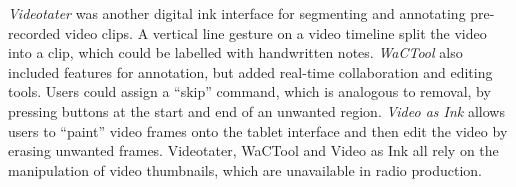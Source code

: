 

\textit{Videotater} \citep{Diakopoulos2006} was another digital ink interface for segmenting and annotating
pre-recorded video clips. A vertical line gesture on a video timeline split the video into a clip, which could be
labelled with handwritten notes.  \textit{WaCTool} \citep{Cattelan2008} also included features for annotation, but
added real-time collaboration and editing tools.  Users could assign a ``skip'' command, which is analogous to removal,
by pressing buttons at the start and end of an unwanted region.  \textit{Video as Ink} \citep{Cabral2016} allows users
to ``paint'' video frames onto the tablet interface and then edit the video by erasing unwanted frames.  Videotater,
WaCTool and Video as Ink all rely on the manipulation of video thumbnails, which are unavailable in radio production.

